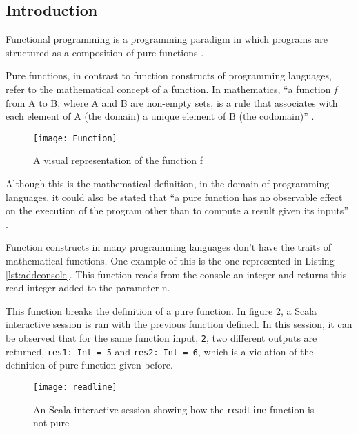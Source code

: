 \documentclass[../main.tex]{subfiles}
\begin{document}
\subsection{Introduction} Functional programming is a programming paradigm in
which programs are structured as a composition of pure functions
\autocite{Hughes1989WhyMatters}.

Pure functions, in contrast to function constructs of programming languages,
refer to the mathematical concept of a function. In mathematics, ``a function \textit{f}
from A to B, where A and B are non-empty sets, is a rule that associates with
each element of A (the domain) a unique element of B (the codomain)''
\autocite{NicholsonTheMathematics}.

\begin{figure}[ht]
  \centering \texttt{[image: Function]}
  \caption{\label{fig:label} A visual representation of the function f}
\end{figure}


Although this is the mathematical definition, in the domain of programming
languages, it could also be stated that ``a pure function has no observable effect
on the execution of the program other than to compute a result given its inputs''
\autocite{Chiusano2013FunctionalScala}.

Function constructs in many programming languages don't have the
traits of mathematical functions. One example of this is the one represented in
Listing \ref{lst:addconsole}. This function reads from the console an integer
and returns this read integer added to the parameter n.



This function breaks the definition of a pure function. In figure
\ref{fig:readLineN}, a Scala interactive session is ran with the previous
function defined. In this session, it can be observed that for the same function input,
\texttt{2}, two different outputs are returned, \texttt{res1: Int = 5} and \texttt{res2:
  Int = 6}, which is a violation of the definition of pure function given before.

\begin{figure}[ht]
  \centering \texttt{[image: readline]}
  \caption{\label{fig:readLineN} An Scala interactive session showing how the
    \texttt{readLine} function is not pure}
\end{figure}
\end{document}

